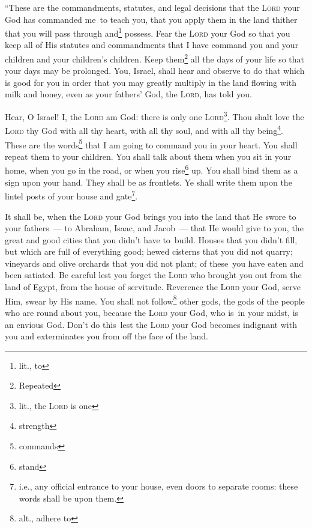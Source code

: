 
\begin{inparaenum}
     ``These are the commandments, statutes, and legal decisions that the \textsc{Lord} your God has commanded me\understood\ to teach you, that you apply them in the land thither that you will pass through and\footnote{lit., to} possess.%
     Fear the \textsc{Lord} your God so that you keep all of His statutes and commandments that I have command you and your children and your children's children. Keep them\footnote{Repeated} all the days of your life so that your days may be prolonged.%
     You, Israel, shall hear and observe to do that which is good for you in order that you may greatly multiply in the land flowing with milk and honey, even as your fathers' God, the \textsc{Lord}, has told you.%
    
     Hear, O Israel! I, the \textsc{Lord} am God: there is only one \textsc{Lord}\footnote{lit., the \textsc{Lord} is one}.%
     Thou shalt love the \textsc{Lord} thy God with all thy heart, with all thy soul, and with all thy being\footnote{strength}.%
     These are the words\footnote{commands} that I am going to command you in your heart.%
     You shall repeat them to your children. You shall talk about them when you sit in your home, when you go in the road, or when you rise\footnote{stand} up.%
     You shall bind them as a sign upon your hand. They shall be as frontlets.%
     Ye shall write them upon the lintel posts of your house and gate\footnote{i.e., any official entrance to your house, even doors to separate rooms: these words shall be upon them.}.%
    
     It shall be, when the \textsc{Lord} your God brings you into the land that He swore to your fathers~--- to Abraham, Isaac, and Jacob~--- that He would give to you, the great and good cities that you didn't have to\understood\ build.%
     Houses that you didn't fill, but which are full of everything good; hewed cisterns that you did not quarry; vineyards and olive orchards that you did not plant; of these\understood\ you have eaten and been satiated.%
     Be careful lest you forget the \textsc{Lord} who brought you out from the land of Egypt, from the house of servitude.%
     Reverence the \textsc{Lord} your God, serve Him, swear by His name.%
     You shall not follow\footnote{alt., adhere to} other gods, the gods of the people who are round about you,%
     because the \textsc{Lord} your God, who is\understood\ in your midst, is an envious God. Don't do this\understood\ lest the \textsc{Lord} your God becomes indignant with you and exterminates you from off the face of the land.%
    

\end{inparaenum}
